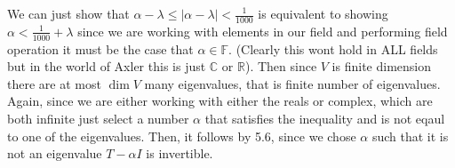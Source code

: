 \documentclass[10pt, twocolumn]{article}
\newcommand{\C}{\mathbb{C}}
\newcommand{\R}{\mathbb{R}}
\newcommand{\F}{\mathbb{F}}
\begin{document}
\begin{q}[13]
	We can just show that $ \alpha - \lambda \leq |\alpha - \lambda| < \frac{1}{1000} $ is equivalent to showing 
	$ \alpha < \frac{1}{1000} + \lambda $ since we are working with elements in our field and performing field operation it must be the case that $ \alpha \in \F $. (Clearly this wont hold in ALL fields but in the world of Axler this is just $ \C $ or $ \R $).
	Then since $ V $ is finite dimension there are at most $ \dim V $ many eigenvalues, that is finite number of eigenvalues. 
	Again, since we are either working with either the reals or complex, which are both infinite just select a number $ \alpha $ that satisfies the inequality and is not eqaul to one of the eigenvalues. 
	Then, it follows by 5.6, since we chose $ \alpha $ such that it is not an eigenvalue $ T - \alpha I $ is invertible.
\end{q}
\end{document}
